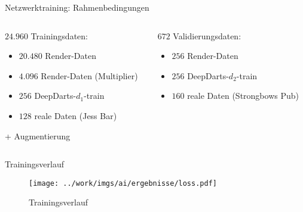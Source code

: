 \begin{frame}{Netzwerktraining: Rahmenbedingungen}

    \begin{columns}
        \begin{column}{0.5\linewidth}

            $24.960$ Trainingsdaten:
            \vspace*{-0.1cm}
            \begin{itemize}
                \setlength\itemsep{0em}
                \item $20.480$ Render-Daten
                \item $4.096$ Render-Daten (Multiplier)
                \item $256$ DeepDarts-$d_1$-train
                \item $128$ reale Daten (Jess Bar)
            \end{itemize}
            + Augmentierung

        \end{column}
        \begin{column}{0.5\linewidth}

            $672$ Validierungsdaten:
            \vspace*{-0.1cm}
            \begin{itemize}
                \setlength\itemsep{0em}
                \item $256$ Render-Daten
                \item $256$ DeepDarts-$d_2$-train
                \item $160$ reale Daten (Strongbows Pub)
            \end{itemize}

        \end{column}
    \end{columns}

    \vspace*{0.5cm}


\end{frame}

\begin{frame}{Trainingsverlauf}

    \begin{figure}
        \centering
        \texttt{[image: ../work/imgs/ai/ergebnisse/loss.pdf]}
        \caption{Trainingsverlauf}
    \end{figure}

\end{frame}

